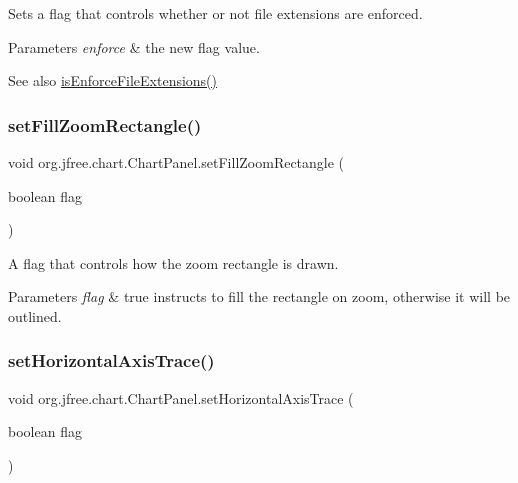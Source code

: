 Sets a flag that controls whether or not file extensions are enforced.


\begin{DoxyParams}{Parameters}
{\em enforce} & the new flag value.\\
\hline
\end{DoxyParams}
\begin{DoxySeeAlso}{See also}
\mbox{\hyperlink{classorg_1_1jfree_1_1chart_1_1_chart_panel_aaebe30d98d0d14bcc5ef0f2015fd34d5}{is\+Enforce\+File\+Extensions()}} 
\end{DoxySeeAlso}
\mbox{\label{classorg_1_1jfree_1_1chart_1_1_chart_panel_a3ada07f651391e5e81f9505e202f64cc}} 
\subsubsection{\texorpdfstring{set\+Fill\+Zoom\+Rectangle()}{setFillZoomRectangle()}}
{\footnotesize\ttfamily void org.\+jfree.\+chart.\+Chart\+Panel.\+set\+Fill\+Zoom\+Rectangle (\begin{DoxyParamCaption}\item[{boolean}]{flag }\end{DoxyParamCaption})}

A flag that controls how the zoom rectangle is drawn.


\begin{DoxyParams}{Parameters}
{\em flag} & {\ttfamily true} instructs to fill the rectangle on zoom, otherwise it will be outlined. \\
\hline
\end{DoxyParams}
\mbox{\label{classorg_1_1jfree_1_1chart_1_1_chart_panel_aa8ed816d3ca76279c899d68408020bfb}} 
\subsubsection{\texorpdfstring{set\+Horizontal\+Axis\+Trace()}{setHorizontalAxisTrace()}}
{\footnotesize\ttfamily void org.\+jfree.\+chart.\+Chart\+Panel.\+set\+Horizontal\+Axis\+Trace (\begin{DoxyParamCaption}\item[{boolean}]{flag }\end{DoxyParamCaption})}

